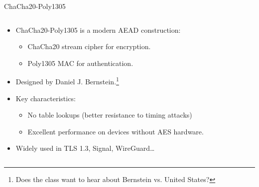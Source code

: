 \documentclass[aspectratio=169, lualatex, handout]{beamer}
\begin{document}
\begin{frame}{ChaCha20-Poly1305}
	\begin{columns}[c]
		\begin{column}{0.55\textwidth}
			\begin{itemize}
				\item ChaCha20-Poly1305 is a modern AEAD construction:
				      \begin{itemize}
					      \item ChaCha20 stream cipher for encryption.
					      \item Poly1305 MAC for authentication.
				      \end{itemize}
				\item Designed by Daniel J. Bernstein.\footnote{Does the class want to hear about Bernstein vs. United States?}
				\item Key characteristics:
				      \begin{itemize}
					      \item No table lookups (better resistance to timing attacks)
					      \item Excellent performance on devices without AES hardware.
				      \end{itemize}
				\item Widely used in TLS 1.3, Signal, WireGuard\ldots
			\end{itemize}
		\end{column}
		\begin{column}{0.45\textwidth}
			\begin{center}
			\end{center}
		\end{column}
	\end{columns}
\end{frame}
\end{document}
